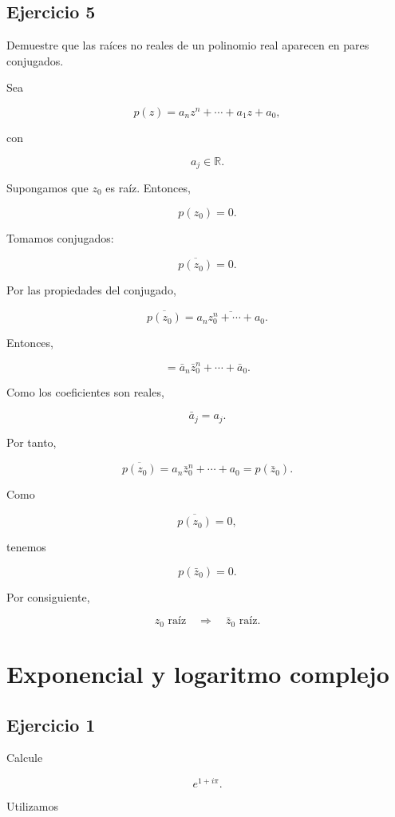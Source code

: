 \documentclass[12pt]{article}
\begin{document}
\subsection*{Ejercicio 5}

Demuestre que las raíces no reales de un polinomio real aparecen en
pares conjugados.

Sea

\[
p(z)
=
a_nz^n+\cdots+a_1z+a_0,
\]

con

\[
a_j\in\mathbb R.
\]

Supongamos que \(z_0\) es raíz. Entonces,

\[
p(z_0)=0.
\]

Tomamos conjugados:

\[
\overline{p(z_0)}=0.
\]

Por las propiedades del conjugado,

\[
\overline{p(z_0)}
=
\overline{
a_nz_0^n+\cdots+a_0
}.
\]

Entonces,

\[
=
\bar a_n\bar z_0^n+\cdots+\bar a_0.
\]

Como los coeficientes son reales,

\[
\bar a_j=a_j.
\]

Por tanto,

\[
\overline{p(z_0)}
=
a_n\bar z_0^n+\cdots+a_0
=
p(\bar z_0).
\]

Como

\[
\overline{p(z_0)}=0,
\]

tenemos

\[
p(\bar z_0)=0.
\]

Por consiguiente,

\[
\boxed{
z_0\text{ raíz}
\quad\Longrightarrow\quad
\bar z_0\text{ raíz}
}.
\]

\section*{Exponencial y logaritmo complejo}

\subsection*{Ejercicio 1}

Calcule

\[
e^{1+i\pi}.
\]

Utilizamos
\end{document}
